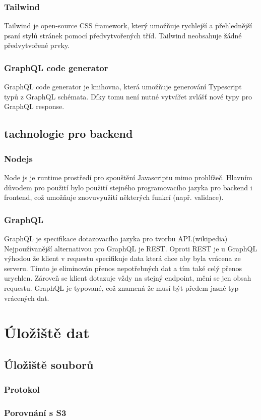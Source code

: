 \documentclass[12pt, a4paper,
 twoside,        %
 openright
]{report}
\begin{document}
\subsection{Tailwind}
Tailwind je open-source CSS framework, který umožňuje rychlejší a přehlednější psaní stylů stránek pomocí předvytvořených tříd. Tailwind neobsahuje žádné předvytvořené prvky.
\subsection{GraphQL code generator}
GraphQL code generator je knihovna, která umožňuje generování Typescript typů z GraphQL schémata. Díky tomu není nutné vytvářet zvlášť nové typy pro GraphQL response.
\section{tachnologie pro backend}
\subsection{Nodejs}
Node js je runtime prostředí pro spouštění Javascriptu mimo prohlížeč. Hlavním důvodem pro použití bylo použití stejného programovacího jazyka pro backend i frontend, což umožňuje znovuvyužití některých funkcí (např. validace).
\subsection{GraphQL}
GraphQL je specifikace dotazovacího jazyka pro tvorbu API.(wikipedia) Nejpoužívanější alternativou pro GraphQL je REST. Oproti REST je u GraphQL výhodou že klient v requestu specifikuje data která chce aby byla vrácena ze serveru. Tímto je eliminován přenos nepotřebných dat a tím také celý přenos urychlen. Zároveň se klient dotazuje vždy na stejný endpoint, mění se jen obsah requestu. GraphQL je typované, což znamená že musí být předem jasné typ vrácených dat.

\chapter{Úložiště dat}
    \section{Úložiště souborů}
 \subsection{Protokol}
\subsection{Porovnání s S3}
\end{document}
